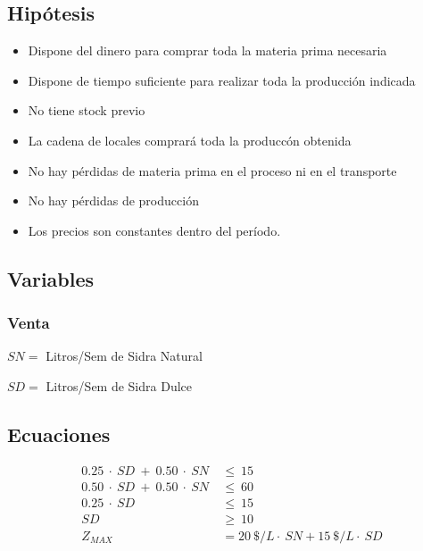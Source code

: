 \documentclass[a4paper,10pt]{article}
\begin{document}
\subsection{Hip\'otesis}
\begin{itemize}
  \item{Dispone del dinero para comprar toda la materia prima necesaria}
 \item{Dispone de tiempo suficiente para realizar toda la producci\'on indicada}
 \item{No tiene stock previo}
 \item{La cadena de locales comprar\'a toda la producc\'on obtenida}
 \item{No hay p\'erdidas de materia prima en el proceso ni en el transporte}
 \item{No hay p\'erdidas de producci\'on}
 \item{Los precios son constantes dentro del per\'iodo.}
\end{itemize}
 
\subsection{Variables}

 \subsubsection{Venta}
\vspace{2mm}
 $ SN = $ Litros/Sem de Sidra Natural
 
 $ SD = $ Litros/Sem de Sidra Dulce
 \vspace{2mm}
 
\subsection{Ecuaciones}

\begin{align*}
0.25\ \cdot \ SD\ + \ 0.50\ \cdot \ SN \ &\leq \ 15  \\
 0.50\ \cdot \ SD\ + \ 0.50\ \cdot \ SN \ &\leq \ 60  \\
 0.25\ \cdot \ SD\ &\leq \ 15  \\
 SD \ &\geq\ 10  \\
 Z_{MAX} &= 20 \ \$/L \cdot \ SN + 15 \ \$/L \cdot \ SD \\
\end{align*}
\end{document}
